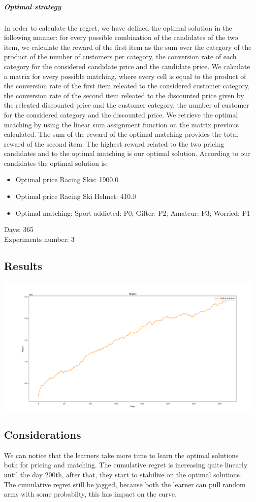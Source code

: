 \subparagraph{Optimal strategy}
In order to calculate the regret, we have defined the optimal solution in the following manner: for every possible combination of the candidates of the two item, we calculate the reward of the first item as the sum over the category of the product of the number of customers per category, the conversion rate of each category for the considered candidate price and the candidate price. We calculate a matrix for every possible matching, where every cell is equal to the product of the conversion rate of the first item releated to the considered customer category, the conversion rate of the second item releated to the discounted price given by the releated discounted price and the customer category, the number of customer for the considered category and the discounted price.
We retrieve the optimal matching by using the linear sum assignment function on the matrix previous calculated. The sum of the reward of the optimal matching provides the total reward of the second item. The highest reward related to the two pricing candidates and to the optimal matching is our optimal solution.
According to our candidates the optimal solution is:
\begin{itemize}
	\item Optimal price Racing Skis: 1900.0
	\item Optimal price Racing Ski Helmet: 410.0
	\item Optimal matching: Sport addicted: P0; Gifter: P2; Amateur: P3; Worried: P1
\end{itemize}
Days: 365\\
Experiments number: 3 \\

\subsection*{Results}
\begin{center}
	\includegraphics[scale=0.35]{Images/n6}
\end{center}

\subsection*{Considerations}
We can notice that the learners take more time to learn the optimal solutions both for pricing and matching. The cumulative regret is increasing quite linearly until the day 200th, after that, they start to stabilize on the optimal solutions. The cumulative regret still be jagged, because both the learner can pull random arms with some probabilty, this has impact on the curve.